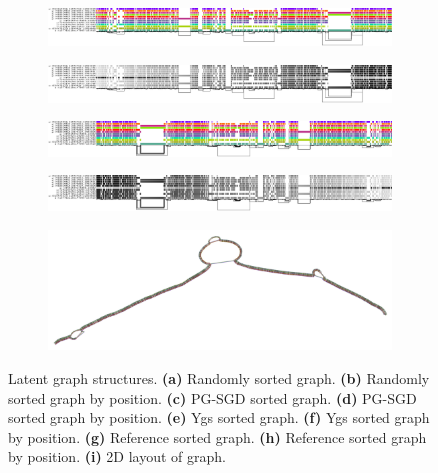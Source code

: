 \begin{figure}[!htb]
\begin{subfigure}[t]{0.4\textwidth}
	\end{subfigure}
	\begin{subfigure}[t]{0.4\textwidth}
		\centering
		\caption{}
		\includegraphics[width=\linewidth]{fig/latent_graph_structure/DRB1-3123.fa.gz.c666522.417fcdf.seqwish.og.Ygs.og.png}
		\label{fig:pipeline}
	\end{subfigure}
	\begin{subfigure}[t]{0.4\textwidth}
		\centering
		\caption{}
		\includegraphics[width=\linewidth]{fig/latent_graph_structure/DRB1-3123.fa.gz.c666522.417fcdf.seqwish.og.Ygs.og.ud.png}
		\label{fig:pipeline_pos}
	\end{subfigure}
	\begin{subfigure}[t]{0.4\textwidth}
		\centering
		\caption{}
		\includegraphics[width=\linewidth]{fig/latent_graph_structure/DRB1-3123.fa.gz.c666522.417fcdf.seqwish.og.YH.og.png}
		\label{fig:ref}
	\end{subfigure}
	\begin{subfigure}[t]{0.4\textwidth}
		\centering
		\caption{}
		\includegraphics[width=\linewidth]{fig/latent_graph_structure/DRB1-3123.fa.gz.c666522.417fcdf.seqwish.og.YH.og.ud.png}
		\label{fig:ref_pos}
	\end{subfigure}
		\begin{subfigure}[t]{0.8\textwidth}
		\centering
		\caption{}
		\includegraphics[width=\linewidth]{fig/latent_graph_structure/TODO_2d.png}
		\label{fig:2d}
	\end{subfigure}
	\caption{
		Latent graph structures.
		\textbf{(a)} Randomly sorted graph. \textbf{(b)} Randomly sorted graph by position. \textbf{(c)} PG-SGD sorted graph. \textbf{(d)} PG-SGD sorted graph by position. \textbf{(e)} Ygs sorted graph. \textbf{(f)} Ygs sorted graph by position. \textbf{(g)} Reference sorted graph. \textbf{(h)} Reference sorted graph by position. \textbf{(i)} 2D layout of graph.
	}
	\label{fig:latent_graph_structure}
\end{figure}